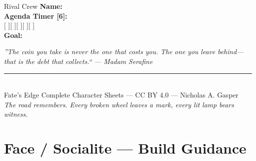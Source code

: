 \documentclass[10pt]{article}
\begin{document}
\begin{minipage}[t]{0.48\linewidth}
    \vspace{0.5em}
    
    \begin{charbox}{Rival Crew}
        \textbf{Name:} \underline{\hspace{5cm}}\\
        \textbf{Agenda Timer [6]:}\\
        [ \hspace{0.3cm} ][ \hspace{0.3cm} ][ \hspace{0.3cm} ][ \hspace{0.3cm} ][ \hspace{0.3cm} ][ \hspace{0.3cm} ]\\
        \textbf{Goal:} \underline{\hspace{5cm}}
    \end{charbox}
\end{minipage}

\vspace{0.5em}
\begin{center}
    {\small\sffamily\itshape ''The coin you take is never the one that costs you. The one you leave behind---that is the debt that collects.`` --- Madam Serafine}
\end{center}

\newpage


\onecolumn
\begin{center}
    \rule{0.5\textwidth}{0.5pt}\\[1em]
    {\small Fate's Edge Complete Character Sheets --- CC BY 4.0 --- Nicholas A. Gasper}\\[0.5em]
    {\tiny \textit{The road remembers. Every broken wheel leaves a mark, every lit lamp bears witness.}}
\end{center}

\newpage

\section*{Face / Socialite --- Build Guidance}
\end{document}
